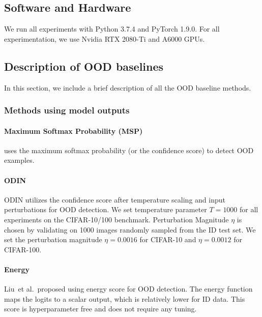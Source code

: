 \documentclass[letterpaper]{article} %
\def\etal{{et al.\xspace}}
\theoremstyle{plain}
\theoremstyle{definition}
\theoremstyle{remark}
\begin{document}
\subsection{Software and Hardware}
\label{app:hardware}
We run all experiments with Python 3.7.4 and PyTorch 1.9.0. For all experimentation, we use Nvidia RTX 2080-Ti and A6000 GPUs.


\subsection{Description of OOD baselines}
\label{app:ood_description}
In this section, we include a brief description of all the OOD baseline methods.
\subsubsection{Methods using model outputs}


\paragraph{Maximum Softmax Probability (MSP)~\cite{hendrycks2016baseline}} uses the maximum softmax probability (or the confidence score) to detect OOD examples.

\paragraph{ODIN~\cite{liang2018enhancing}} ODIN utilizes the confidence score after temperature scaling and input perturbations for OOD detection. We set temperature parameter $T=1000$ for all experiments on the CIFAR-10/100 benchmark. Perturbation Magnitude $\eta$ is chosen by validating on 1000 images randomly sampled from the ID test set. We set the perturbation magnitude $\eta = 0.0016$ for CIFAR-10 and $\eta = 0.0012$ for CIFAR-100.

\paragraph{Energy~\cite{liu2020energy}} Liu~\etal~proposed using energy score for OOD detection. The energy function maps the logits to a scalar output, which is relatively
lower for ID data. This score is hyperparameter free and does not require any tuning.
\end{document}
